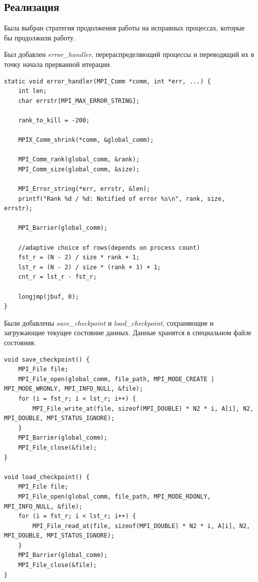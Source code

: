 \documentclass[a4paper,12pt,titlepage,final]{article}
\begin{document}
\subsection{Реализация}
Была выбран стратегия продолжения работы на исправных процессах, которые бы продолжили работу.\par
Был добавлен \textit{error\_handler}, перераспределяющий процессы и переводящий их в точку начала прерванной итерации.
\begin{verbatim}
static void error_handler(MPI_Comm *comm, int *err, ...) {
    int len;
    char errstr[MPI_MAX_ERROR_STRING];

    rank_to_kill = -200;

    MPIX_Comm_shrink(*comm, &global_comm);
    
    MPI_Comm_rank(global_comm, &rank);
    MPI_Comm_size(global_comm, &size);
    
    MPI_Error_string(*err, errstr, &len);
    printf("Rank %d / %d: Notified of error %s\n", rank, size, errstr);
    
    MPI_Barrier(global_comm);
    
    //adaptive choice of rows(depends on process count)
    fst_r = (N - 2) / size * rank + 1;
    lst_r = (N - 2) / size * (rank + 1) + 1;
    cnt_r = lst_r - fst_r;

    longjmp(jbuf, 0);
}
\end{verbatim}
Были добавлены \textit{save\_checkpoint} и \textit{load\_checkpoint}, сохраняющие и загружающие текущее состояние данных. Данные хранятся в специальном файле состояния.
\begin{verbatim}
void save_checkpoint() {
    MPI_File file;
    MPI_File_open(global_comm, file_path, MPI_MODE_CREATE | MPI_MODE_WRONLY, MPI_INFO_NULL, &file);
    for (i = fst_r; i < lst_r; i++) {
        MPI_File_write_at(file, sizeof(MPI_DOUBLE) * N2 * i, A[i], N2, MPI_DOUBLE, MPI_STATUS_IGNORE);
    }
    MPI_Barrier(global_comm);
    MPI_File_close(&file);
}

void load_checkpoint() {
    MPI_File file;
    MPI_File_open(global_comm, file_path, MPI_MODE_RDONLY, MPI_INFO_NULL, &file);
    for (i = fst_r; i < lst_r; i++) {
        MPI_File_read_at(file, sizeof(MPI_DOUBLE) * N2 * i, A[i], N2, MPI_DOUBLE, MPI_STATUS_IGNORE);
    }
    MPI_Barrier(global_comm);
    MPI_File_close(&file);
}
\end{verbatim}
\end{document}
